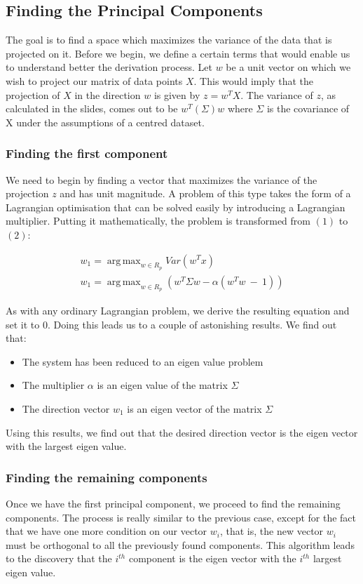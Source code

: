 \documentclass{article}
\DeclareMathOperator*{\argmax}{arg\,max}
\begin{document}
\bigskip

\subsection{Finding the Principal Components}
The goal is to find a space which maximizes the variance of the data that is projected on it. Before we begin, we define a certain terms that would enable us to understand better the derivation process. Let $w$ be a unit vector on which we wish to project our matrix of data points $X$.
This would imply that the projection of $X$ in the direction $w$ is given by $z = w^T X$. The variance of $z$, as calculated in the slides, comes out to be $w^T(\Sigma)w$ where $\Sigma$ is the covariance of X under the assumptions of a centred dataset.

\subsubsection{Finding the first component}
We need to begin by finding a vector that maximizes the variance of the projection $z$ and has unit magnitude. A problem of this type takes the form of a Lagrangian optimisation that can be solved easily by introducing a Lagrangian multiplier. Putting it mathematically, the problem is transformed from $(1)$ to $(2)$:

\begin{gather}
    w_1 = \argmax_ { w \in R_p} Var(w^T x) \\
    w_1 = \argmax_ { w \in R_p} (w^T \Sigma w - \alpha (w^Tw \ - \ 1))
\end{gather}

As with any ordinary Lagrangian problem, we derive the resulting equation and set it to 0. Doing this leads us to a couple of astonishing results. We find out that:

\begin{itemize}
    \item The system has been reduced to an eigen value problem
    \item The multiplier $\alpha$ is an eigen value of the matrix $\Sigma$
    \item The direction vector $w_1$ is an eigen vector of the matrix $\Sigma$
\end{itemize}

Using this results, we find out that the desired direction vector is the eigen vector with the largest eigen value.

\subsubsection{Finding the remaining components}
Once we have the first principal component, we proceed to find the remaining components. The process is really similar to the previous case, except for the fact that we have one more condition on our vector $w_i$, that is, the new vector $w_i$ must be orthogonal to all the previously found components. This algorithm leads to the discovery that the $i^{th}$ component is the eigen vector with the $i^{th}$ largest eigen value.
\end{document}
